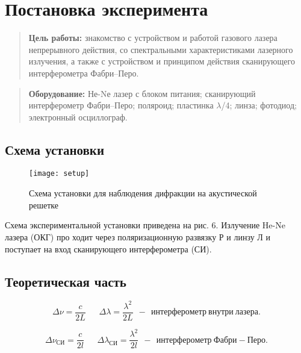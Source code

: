 \documentclass{lab}
\begin{document}

\section*{Постановка эксперимента}

\begin{quote}
	\textbf{{\normalsize Цель работы: }}
	знакомство с устройством и работой газового лазера
	непрерывного действия, со спектральными характеристиками лазерного излучения, а также с устройством и принципом действия сканирующего интерферометра Фабри–Перо.
\end{quote}

\begin{quote}
	\textbf{{\normalsize Оборудование: }}
	Не-Nе лазер с блоком питания; сканирующий интерферометр Фабри–Перо; поляроид; пластинка $ \lambda $/4; линза;
	фотодиод; электронный осциллограф.
\end{quote}

\subsection*{Схема установки}

\begin{figure}[H]
	\centering
	\texttt{[image: setup]}
	\caption{Схема установки для наблюдения дифракции на акустической решетке}
	\label{scheme}
\end{figure}

Схема экспериментальной
установки приведена на рис. 6. Излучение He-Ne лазера (ОКГ) про
ходит через
поляризационную развязку
Р
и линзу
Л
и поступает на вход сканирующего интерферометра (СИ).

\subsection*{Теоретическая часть}

\begin{equation}
\Delta \nu = \dfrac{c}{2L} ~~~~~~~ \Delta \lambda = \dfrac{\lambda^2}{2L} ~~-~~ интерферометр~внутри~лазера.
\end{equation}

\begin{equation}
\Delta \nu_{СИ} = \dfrac{c}{2l} ~~~~~~~ \Delta \lambda_{СИ} = \dfrac{\lambda^2}{2l} ~~-~~ интерферометр~Фабри-Перо.
\end{equation}
\end{document}
